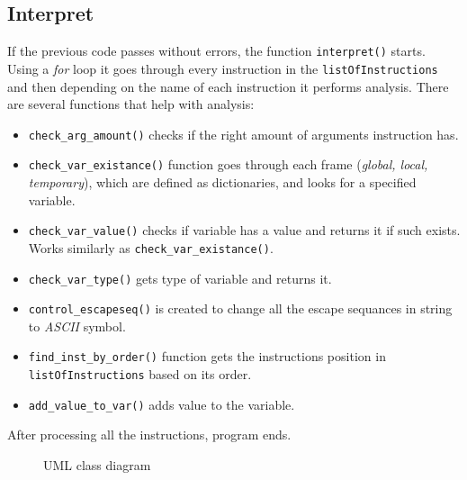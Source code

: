 \documentclass[11pt, a4paper]{article}
\begin{document}
\subsection{Interpret}
If the previous code passes without errors, the function \verb|interpret()| starts. Using a \emph{for} loop 
it goes through every instruction in the \verb|listOfInstructions| and then depending on the name of each instruction it 
performs analysis. There are several functions that help with analysis:
\begin{itemize}
    \item \verb|check_arg_amount()| checks if the right amount of arguments instruction has.
    \item \verb|check_var_existance()| function goes through each frame (\emph{global, local, temporary}), which are defined as dictionaries,
    and looks for a specified variable.
    \item \verb|check_var_value()| checks if variable has a value and returns it if such exists. Works similarly as \verb|check_var_existance()|.
    \item \verb|check_var_type()| gets type of variable and returns it.
    \item \verb|control_escapeseq()| is created to change all the escape sequances in string to \emph{ASCII} symbol.
    \item \verb|find_inst_by_order()| function gets the instructions position in \verb|listOfInstructions| based on its order.
    \item \verb|add_value_to_var()| adds value to the variable.
\end{itemize}
After processing all the instructions, program ends.
\newpage
\begin{figure}[ht] 
    \begin{center}
        \caption{UML class diagram}
    \end{center}
\end{figure}
\end{document}
